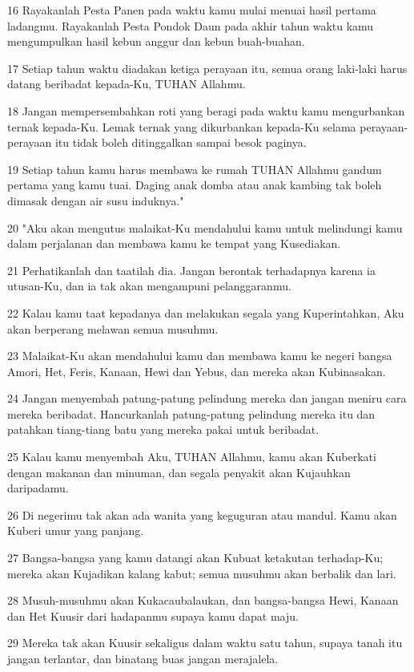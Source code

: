 \par 16 Rayakanlah Pesta Panen pada waktu kamu mulai menuai hasil pertama ladangmu. Rayakanlah Pesta Pondok Daun pada akhir tahun waktu kamu mengumpulkan hasil kebun anggur dan kebun buah-buahan.
\par 17 Setiap tahun waktu diadakan ketiga perayaan itu, semua orang laki-laki harus datang beribadat kepada-Ku, TUHAN Allahmu.
\par 18 Jangan mempersembahkan roti yang beragi pada waktu kamu mengurbankan ternak kepada-Ku. Lemak ternak yang dikurbankan kepada-Ku selama perayaan-perayaan itu tidak boleh ditinggalkan sampai besok paginya.
\par 19 Setiap tahun kamu harus membawa ke rumah TUHAN Allahmu gandum pertama yang kamu tuai. Daging anak domba atau anak kambing tak boleh dimasak dengan air susu induknya."
\par 20 "Aku akan mengutus malaikat-Ku mendahului kamu untuk melindungi kamu dalam perjalanan dan membawa kamu ke tempat yang Kusediakan.
\par 21 Perhatikanlah dan taatilah dia. Jangan berontak terhadapnya karena ia utusan-Ku, dan ia tak akan mengampuni pelanggaranmu.
\par 22 Kalau kamu taat kepadanya dan melakukan segala yang Kuperintahkan, Aku akan berperang melawan semua musuhmu.
\par 23 Malaikat-Ku akan mendahului kamu dan membawa kamu ke negeri bangsa Amori, Het, Feris, Kanaan, Hewi dan Yebus, dan mereka akan Kubinasakan.
\par 24 Jangan menyembah patung-patung pelindung mereka dan jangan meniru cara mereka beribadat. Hancurkanlah patung-patung pelindung mereka itu dan patahkan tiang-tiang batu yang mereka pakai untuk beribadat.
\par 25 Kalau kamu menyembah Aku, TUHAN Allahmu, kamu akan Kuberkati dengan makanan dan minuman, dan segala penyakit akan Kujauhkan daripadamu.
\par 26 Di negerimu tak akan ada wanita yang keguguran atau mandul. Kamu akan Kuberi umur yang panjang.
\par 27 Bangsa-bangsa yang kamu datangi akan Kubuat ketakutan terhadap-Ku; mereka akan Kujadikan kalang kabut; semua musuhmu akan berbalik dan lari.
\par 28 Musuh-musuhmu akan Kukacaubalaukan, dan bangsa-bangsa Hewi, Kanaan dan Het Kuusir dari hadapanmu supaya kamu dapat maju.
\par 29 Mereka tak akan Kuusir sekaligus dalam waktu satu tahun, supaya tanah itu jangan terlantar, dan binatang buas jangan merajalela.
